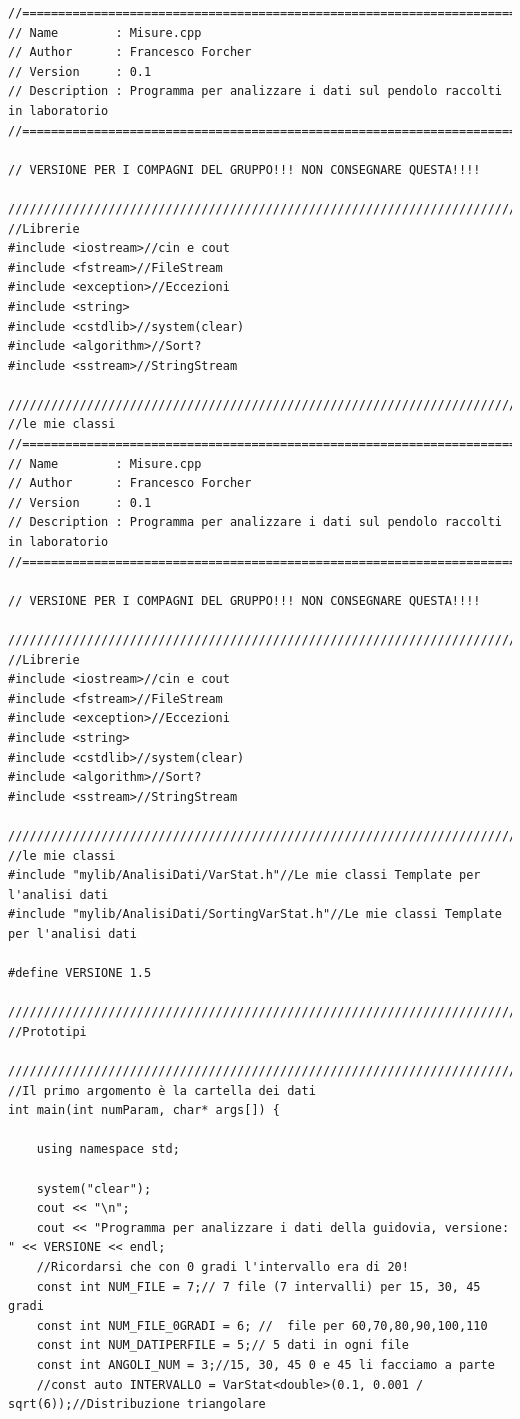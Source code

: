 \documentclass[12pt]{article} %
\begin{document}
	\begin{verbatim}
//============================================================================
// Name        : Misure.cpp
// Author      : Francesco Forcher
// Version     : 0.1
// Description : Programma per analizzare i dati sul pendolo raccolti in laboratorio
//============================================================================

// VERSIONE PER I COMPAGNI DEL GRUPPO!!! NON CONSEGNARE QUESTA!!!!

/////////////////////////////////////////////////////////////////////////////////////
//Librerie
#include <iostream>//cin e cout
#include <fstream>//FileStream
#include <exception>//Eccezioni
#include <string>
#include <cstdlib>//system(clear)
#include <algorithm>//Sort?
#include <sstream>//StringStream

/////////////////////////////////////////////////////////////////////////////////////
//le mie classi
//============================================================================
// Name        : Misure.cpp
// Author      : Francesco Forcher
// Version     : 0.1
// Description : Programma per analizzare i dati sul pendolo raccolti in laboratorio
//============================================================================

// VERSIONE PER I COMPAGNI DEL GRUPPO!!! NON CONSEGNARE QUESTA!!!!

/////////////////////////////////////////////////////////////////////////////////////
//Librerie
#include <iostream>//cin e cout
#include <fstream>//FileStream
#include <exception>//Eccezioni
#include <string>
#include <cstdlib>//system(clear)
#include <algorithm>//Sort?
#include <sstream>//StringStream

/////////////////////////////////////////////////////////////////////////////////////
//le mie classi
#include "mylib/AnalisiDati/VarStat.h"//Le mie classi Template per l'analisi dati
#include "mylib/AnalisiDati/SortingVarStat.h"//Le mie classi Template per l'analisi dati

#define VERSIONE 1.5

/////////////////////////////////////////////////////////////////////////////////////
//Prototipi

/////////////////////////////////////////////////////////////////////////////////////
//Il primo argomento è la cartella dei dati
int main(int numParam, char* args[]) {

	using namespace std;

	system("clear");
	cout << "\n";
	cout << "Programma per analizzare i dati della guidovia, versione: " << VERSIONE << endl;
	//Ricordarsi che con 0 gradi l'intervallo era di 20!
	const int NUM_FILE = 7;// 7 file (7 intervalli) per 15, 30, 45 gradi
	const int NUM_FILE_0GRADI = 6; //  file per 60,70,80,90,100,110
	const int NUM_DATIPERFILE = 5;// 5 dati in ogni file
	const int ANGOLI_NUM = 3;//15, 30, 45 0 e 45 li facciamo a parte
	//const auto INTERVALLO = VarStat<double>(0.1, 0.001 / sqrt(6));//Distribuzione triangolare


\end{verbatim}
\end{document}
